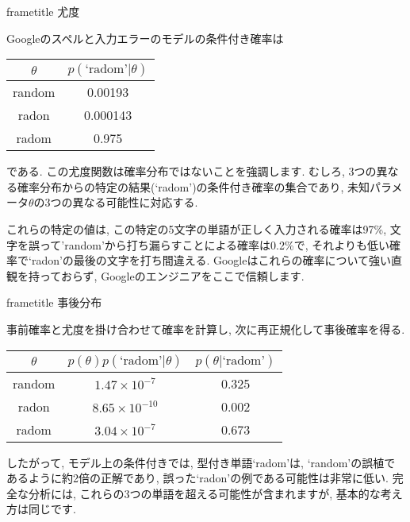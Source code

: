 \documentclass[10pt,dvipdfmx,a4]{beamer}
\newcommand{\dbox}[1]{\begin{beamercolorbox}[wd=122mm, sep=0pt, shadow=false, rounded=false]{frametitle} { #1}\end{beamercolorbox}}
\begin{document}

\begin{frame}
\dbox{尤度}
Googleのスペルと入力エラーのモデルの条件付き確率は
\begin{table}[htb]
  \begin{tabular}{cc}
    $\theta$ & $p(\text{`radom'}|\theta)$\\ \hline
    random & 0.00193  \\
    radon   & 0.000143 \\
    radom   &0.975 \\
  \end{tabular}
\end{table}
である.
この尤度関数は確率分布ではないことを強調します.
むしろ, 3つの異なる確率分布からの特定の結果(`radom')の条件付き確率の集合であり, 未知パラメータ$\theta$の3つの異なる可能性に対応する.

これらの特定の値は, この特定の5文字の単語が正しく入力される確率は97\%, 文字を誤って'random'から打ち漏らすことによる確率は0.2\%で, それよりも低い確率で`radon'の最後の文字を打ち間違える.
Googleはこれらの確率について強い直観を持っておらず, Googleのエンジニアをここで信頼します.
\end{frame}


\begin{frame}
\dbox{事後分布}
事前確率と尤度を掛け合わせて確率を計算し, 次に再正規化して事後確率を得る.
\begin{table}[htb]
  \begin{tabular}{ccc}
    $\theta$ & $p(\theta)p(\text{`radom'}|\theta)$ & $p(\theta|\text{`radom'})$ \\ \hline
    random & $1.47\times 10^{-7}$ & 0.325 \\
    radon   & $8.65\times 10^{-10}$  & 0.002 \\
    radom   & $3.04\times10^{-7}$  & 0.673 \\
  \end{tabular}
\end{table}
したがって, モデル上の条件付きでは, 型付き単語`radom'は, `random'の誤植であるように約2倍の正解であり, 誤った`radon'の例である可能性は非常に低い.
完全な分析には, これらの3つの単語を超える可能性が含まれますが, 基本的な考え方は同じです.
\end{frame}

\end{document}
